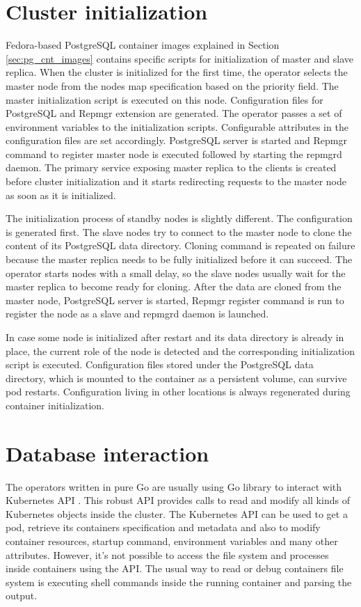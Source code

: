 \documentclass[
  digital, %
  twoside, %
  table,   %
  nolof,   %
  nolot,   %
]{fithesis3}
\begin{document}
\section{Cluster initialization}
Fedora-based PostgreSQL container images explained in Section \ref{sec:pg_cnt_images} contains specific scripts for initialization of master and slave replica. When the cluster is initialized for the first time, the operator selects the master node from the nodes map specification based on the priority field. The master initialization script is executed on this node. Configuration files for PostgreSQL and Repmgr extension are generated. The operator passes a set of environment variables to the initialization scripts. Configurable attributes in the configuration files are set accordingly. PostgreSQL server is started and Repmgr command to register master node is executed followed by starting the repmgrd daemon. The primary service exposing master replica to the clients is created before cluster initialization and it starts redirecting requests to the master node as soon as it is initialized.

The initialization process of standby nodes is slightly different. The configuration is generated first. The slave nodes try to connect to the master node to clone the content of its PostgreSQL data directory. Cloning command is repeated on failure because the master replica needs to be fully initialized before it can succeed. The operator starts nodes with a small delay, so the slave nodes usually wait for the master replica to become ready for cloning. After the data are cloned from the master node, PostgreSQL server is started, Repmgr register command is run to register the node as a slave and repmgrd daemon is launched.

In case some node is initialized after restart and its data directory is already in place, the current role of the node is detected and the corresponding initialization script is executed. Configuration files stored under the PostgreSQL data directory, which is mounted to the container as a persistent volume, can survive pod restarts. Configuration living in other locations is always regenerated during container initialization.

\section{Database interaction}
The operators written in pure Go are usually using Go library to interact with Kubernetes API \cite{k8s-api}. This robust API provides calls to read and modify all kinds of Kubernetes objects inside the cluster. The Kubernetes API can be used to get a pod, retrieve its containers specification and metadata and also to modify container resources, startup command, environment variables and many other attributes. However, it’s not possible to access the file system and processes inside containers using the API. The usual way to read or debug containers file system is executing shell commands inside the running container and parsing the output.
\end{document}
